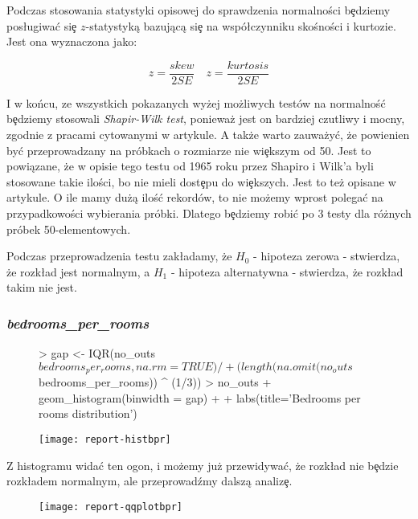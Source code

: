 \documentclass{article}
\begin{document}
\noindent
\quad Podczas stosowania statystyki opisowej do sprawdzenia normalności b\c edziemy pos\l ugiwa\'c si\c e $z$-statystyką bazującą si\c e na wspó\l czynniku skośności i kurtozie. Jest ona wyznaczona jako:

\[ z = \frac{skew}{2SE} \quad z = \frac{kurtosis}{2SE} \]

\noindent
\quad I w końcu, ze wszystkich pokazanych wyżej możliwych testów na normalnoś\'c b\c edziemy stosowali \textit{Shapir-Wilk test}, ponieważ jest on bardziej czutliwy i mocny, zgodnie z pracami cytowanymi w artykule. A także warto zauważy\'c, że powienien by\'c przeprowadzany na próbkach o rozmiarze nie wi\c ekszym od 50. Jest to powiązane, że w opisie tego testu od 1965 roku przez Shapiro i Wilk'a byli stosowane takie ilości, bo nie mieli dost\c epu do wi\c ekszych. Jest to też opisane w artykule. O ile mamy dużą iloś\'c rekordów, to nie możemy wprost polega\'c na przypadkowości wybierania próbki. Dlatego b\c edziemy robi\'c po 3 testy dla różnych próbek 50-elementowych.

\noindent
\quad Podczas przeprowadzenia testu zak\l adamy, że \textbf{$H_0$} - hipoteza zerowa - stwierdza, że rozk\l ad jest normalnym, a \textbf{$H_1$} - hipoteza alternatywna - stwierdza, że rozk\l ad takim nie jest.
 
\subsubsection{\textit{bedrooms\_per\_rooms}}
\begin{figure}[h!]
\centering
\begin{Schunk}
\begin{Sinput}
> gap <- IQR(no_outs$bedrooms_per_rooms, na.rm=TRUE) / 
+   (length(na.omit(no_outs$bedrooms_per_rooms)) ^ (1/3))
> no_outs %>% ggplot(aes(x=bedrooms_per_rooms)) + plot.properties +
+   geom_histogram(binwidth = gap) +
+   labs(title='Bedrooms per rooms distribution')
\end{Sinput}
\end{Schunk}
\texttt{[image: report-histbpr]}
\end{figure}

\noindent
\quad Z histogramu wida\'c ten ogon, i możemy już przewidywa\'c, że rozk\l ad nie b\c edzie rozk\l adem normalnym, ale przeprowadźmy dalszą analiz\c e.

\begin{figure}[h!]
\centering
\texttt{[image: report-qqplotbpr]}
\end{figure}
\end{document}

